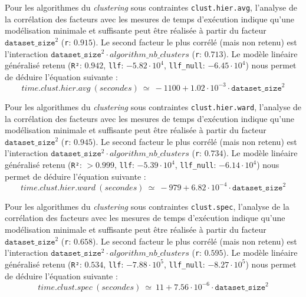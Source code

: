 			Pour les algorithmes du \textit{clustering} sous contraintes \texttt{clust.hier.avg}, l'analyse de la corrélation des facteurs avec les mesures de temps d'exécution indique qu'une modélisation minimale et suffisante peut être réalisée à partir du facteur $\texttt{dataset\_size}^{2}$ (\texttt{r}: $0.915$).
			Le second facteur le plus corrélé (mais non retenu) est l'interaction $\texttt{dataset\_size}^{2} \cdot algorithm\_nb\_clusters$ (\texttt{r}: $0.713$).
			Le modèle linéaire généralisé retenu (\texttt{R²}: $0.942$, \texttt{llf}: $-5.82 \cdot 10^{4}$, \texttt{llf\_null}: $-6.45 \cdot 10^{4}$) nous permet de déduire l'équation suivante :
			\begin{equation}
				time.clust.hier.avg~(secondes)~
				\simeq~-1100 + 1.02 \cdot 10^{-3} \cdot \texttt{dataset\_size}^{2}
			\end{equation}

			Pour les algorithmes du \textit{clustering} sous contraintes \texttt{clust.hier.ward}, l'analyse de la corrélation des facteurs avec les mesures de temps d'exécution indique qu'une modélisation minimale et suffisante peut être réalisée à partir du facteur $\texttt{dataset\_size}^{2}$ (\texttt{r}: $0.945$).
			Le second facteur le plus corrélé (mais non retenu) est l'interaction $\texttt{dataset\_size}^{2} \cdot algorithm\_nb\_clusters$ (\texttt{r}: $0.734$).
			Le modèle linéaire généralisé retenu (\texttt{R²}: $> 0.999$, \texttt{llf}: $-5.39 \cdot 10^{4}$, \texttt{llf\_null}: $-6.14 \cdot 10^{4}$) nous permet de déduire l'équation suivante :
			\begin{equation}
				time.clust.hier.ward~(secondes)~
				\simeq~-979 + 6.82 \cdot 10^{-4} \cdot \texttt{dataset\_size}^{2}
			\end{equation}
			
			Pour les algorithmes du \textit{clustering} sous contraintes \texttt{clust.spec}, l'analyse de la corrélation des facteurs avec les mesures de temps d'exécution indique qu'une modélisation minimale et suffisante peut être réalisée à partir du facteur $\texttt{dataset\_size}^{2}$ (\texttt{r}: $0.658$).
			Le second facteur le plus corrélé (mais non retenu) est l'interaction $\texttt{dataset\_size}^{2} \cdot algorithm\_nb\_clusters$ (\texttt{r}: $0.595$).
			Le modèle linéaire généralisé retenu (\texttt{R²}: $0.534$, \texttt{llf}: $-7.88 \cdot 10^{5}$, \texttt{llf\_null}: $-8.27 \cdot 10^{5}$) nous permet de déduire l'équation suivante :
			\begin{equation}
				time.clust.spec~(secondes)~
				\simeq~11 + 7.56 \cdot 10^{-6} \cdot \texttt{dataset\_size}^{2}
			\end{equation}
			
